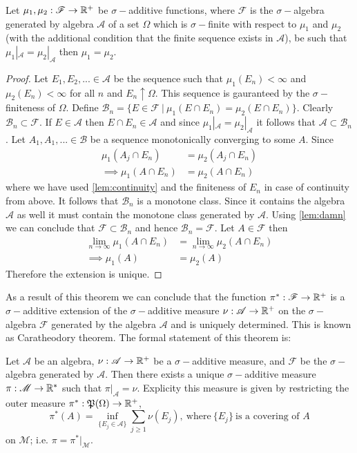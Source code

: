  \begin{theorem}
   Let $\mu_1, \mu_2: \mathscr{F} \to \mathbb{R}^+$ be $\sigma-$additive functions, where $ \mathscr{F}$ is the $\sigma-$algebra generated by algebra $ \mathscr{A}$ of a set $\Omega$ which is $\sigma-$finite with respect to $\mu_1$ and $\mu_2$ (with the additional condition that the finite sequence exists in $ \mathscr{A}$), be such that $\mu_1|_{ \mathscr{A}} = \mu_2|_{ \mathscr{A}}$ then $\mu_1 = \mu_2$. 
 \end{theorem}
 \begin{proof}
   Let $E_1, E_2,... \in \mathscr{A}$ be the sequence such that $\mu_1(E_n)<\infty$ and $\mu_2(E_n)<\infty$ for all $n$ and $E_n \uparrow \Omega$. This sequence is gauranteed by the $\sigma-$finiteness of $\Omega$. Define $ \mathscr{B}_n = \{E \in \mathscr{F}\ |\ \mu_1(E\cap E_n) = \mu_2(E\cap E_n)\}$. Clearly $ \mathscr{B}_n \subset \mathscr{F}$. If $E \in \mathscr{A}$ then $E\cap E_n \in \mathscr{A}$ and since $\mu_1|_{ \mathscr{A}} = \mu_2|_{ \mathscr{A}}$ it follows that $ \mathscr{A} \subset \mathscr{B}_n$. Let $A_1,A_1,...\in \mathscr{B}$ be a sequence monotonically converging to some $A$. Since
   \begin{align*}
     \mu_1(A_j\cap E_n) &= \mu_2(A_j\cap E_n)\\
     \implies \mu_1(A\cap E_n) &= \mu_2(A\cap E_n)
   \end{align*}
   where we have used \cref{lem:continuity} and the finiteness of $E_n$ in case of continuity from above. It follows that $ \mathscr{B}_n$ is a monotone class. Since it contains the algebra $ \mathscr{A}$ as well it must contain the monotone class generated by $ \mathscr{A}$. Using \cref{lem:damn} we can conclude that $ \mathscr{F}\subset \mathscr{B}_n$ and hence $ \mathscr{B}_n = \mathscr{F}$. Let $A\in \mathscr{F}$ then
   \begin{align*}
     \lim_{n\to \infty}\mu_1(A\cap E_n) &= \lim_{n\to\infty}\mu_2(A\cap E_n)\\
     \implies \mu_1(A) &= \mu_2(A)
   \end{align*}
   Therefore the extension is unique.
 \end{proof}
 As a result of this theorem we can conclude that the function $\pi^*: \mathscr{F}\to\mathbb{R}^+$ is a $\sigma-$additive extension  of the $\sigma-$additive measure $\nu: \mathscr{A}\to \mathbb{R}^+$ on the $\sigma-$algebra $ \mathscr{F}$ generated by the algebra $ \mathscr{A}$ and is uniquely determined. This is known as Caratheodory theorem. The formal statement of this theorem is:
 \begin{theorem}\label{thm:caratheodory}
   Let $ \mathscr{A}$ be an algebra, $\nu: \mathscr{A}\to \mathbb{R}^+$ be a $\sigma-$additive measure, and $ \mathscr{F}$ be the $\sigma-$algebra generated by $ \mathscr{A}$. Then there exists a unique $\sigma-$additive measure $\pi: \mathscr{M} \to \mathbb{R}^*$ such that $\pi|_{ \mathscr{A}} = \nu$. Explicity this measure is given by restricting the outer measure $\pi^*: \mathfrak{P} (\Omega) \to \mathbb{R}^+$,
   \[\pi^*(A) = \inf_{\{E_j\in \mathscr{A}\}} \sum_{j\geq 1} \nu(E_j),\ \text{where}\ \{E_j\}\ \text{is a covering of $A$}\]
   on $ \mathscr{M}$; i.e. $\pi = \pi^*|_{ \mathscr{M}}$. 
 \end{theorem}
